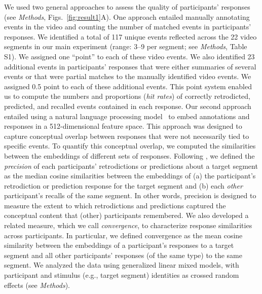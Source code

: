 \documentclass[10pt]{article}
\newcommand{\stimDescription}{S1}
\begin{document}
We used two general approaches to assess the quality of participants' responses (see \textit{Methods}, Figs.~\ref{fig:result1}A). One approach entailed manually annotating events in the video and counting the number of matched events in participants' responses. We identified a total of 117 unique events reflected across the 22 video segments in our main experiment (range: 3--9 per segment; see \textit{Methods}, Table \stimDescription). We assigned one ``point'' to each of these video events. We also identified 23 additional events in participants' responses that were either summaries of several events or that were partial matches to the manually identified video events. We assigned 0.5 point to each of these additional events. This point system enabled us to compute the numbers and proportions (\textit{hit rates}) of correctly retrodicted, predicted, and recalled events contained in each response. Our second approach entailed using a natural language processing model~\citep{CerEtal18} to embed annotations and responses in a 512-dimensional feature space. This approach was designed to capture conceptual overlap between responses that were not necessarily tied to specific events. To quantify this conceptual overlap, we computed the similarities between the embeddings of different sets of responses. Following \cite{HeusEtal21}, we defined the \textit{precision} of each participants' retrodictions or predictions about a target segment as the median cosine similarities between the embeddings of (a) the participant's retrodiction or prediction response for the target segment and (b) each \textit{other} participant's recalls of the same segment. In other words, precision is designed to measure the extent to which retrodictions and predictions captured the conceptual content that (other) participants remembered. We also developed a related measure, which we call \textit{convergence}, to characterize response similarities across participants. In particular, we defined convergence as the mean cosine similarity between the embeddings of a participant's responses to a target segment and all other participants' responses (of the same type) to the same segment. We analyzed the data using generalized linear mixed models, with participant and stimulus (e.g., target segment) identities as crossed random effects (see \textit{Methods}).
\end{document}
